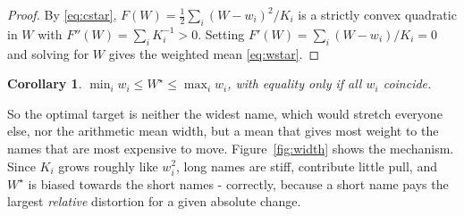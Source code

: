 \documentclass[10pt,twocolumn]{article}
\theoremstyle{plain}
\newtheorem{corollary}[proposition]{Corollary}
\theoremstyle{definition}
\begin{document}
  \begin{proof}
    By \eqref{eq:cstar}, $F(W) = \frac12 \sum_i (W - w_i)^2 / K_i$ is a strictly convex quadratic in $W$ with $F''(W) = \sum_i K_i^{-1} > 0$.
    Setting $F'(W) = \sum_i (W - w_i)/K_i = 0$ and solving for $W$ gives the weighted mean \eqref{eq:wstar}.
  \end{proof}

  \begin{corollary}
    $\min_i w_i \le W^\star \le \max_i w_i$, with equality only if all $w_i$ coincide.
  \end{corollary}

  So the optimal target is neither the widest name, which would stretch everyone else, nor the arithmetic mean width, but a mean that gives most weight to the names that are most expensive to move.
  Figure~\ref{fig:width} shows the mechanism.
  Since $K_i$ grows roughly like $w_i^2$, long names are stiff, contribute little pull, and $W^\star$ is biased towards the short names - correctly, because a short name pays the largest \emph{relative} distortion for a given absolute change.
\end{document}

